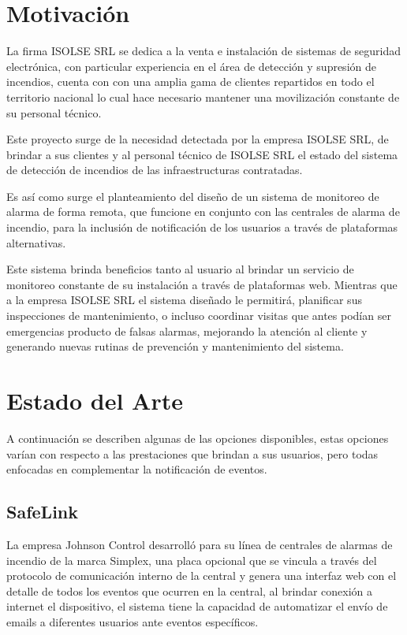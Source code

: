 \section{Motivación}

La firma ISOLSE SRL se dedica a la venta e instalación de sistemas de seguridad electrónica, con particular experiencia en el área de detección y supresión de incendios, cuenta con con una amplia gama de clientes repartidos en todo el territorio nacional lo cual hace necesario mantener una movilización constante de su personal técnico. 

Este proyecto surge de la necesidad detectada por la empresa ISOLSE SRL, de brindar a sus clientes y al personal técnico de ISOLSE SRL el estado del sistema de detección de incendios de las infraestructuras contratadas.

Es así como surge el planteamiento del diseño de un sistema de monitoreo de alarma de forma remota, que funcione en conjunto con las centrales de alarma de incendio, para la  inclusión de notificación de los usuarios a través de plataformas alternativas.

Este sistema brinda beneficios tanto al usuario al brindar un servicio de monitoreo constante de su instalación a través de plataformas web.  Mientras que a la empresa ISOLSE SRL el sistema diseñado le permitirá, planificar sus inspecciones de mantenimiento, o incluso coordinar visitas que antes podían ser emergencias producto de falsas alarmas, mejorando la atención al cliente y generando nuevas rutinas de prevención y mantenimiento del sistema.


\section{Estado del Arte}

A continuación se describen algunas de las opciones disponibles, estas opciones varían con respecto a las prestaciones que brindan a sus usuarios, pero todas enfocadas en complementar la notificación de eventos. 

\subsection{SafeLink}

La empresa Johnson Control desarrolló para su línea de centrales de alarmas de incendio de la marca Simplex, una placa opcional que se vincula a través del  protocolo de comunicación interno de la central y genera una interfaz web con el detalle de todos los eventos que ocurren en la central, al brindar conexión a internet el dispositivo, el sistema tiene la capacidad de automatizar el envío de emails a diferentes usuarios ante eventos específicos.

